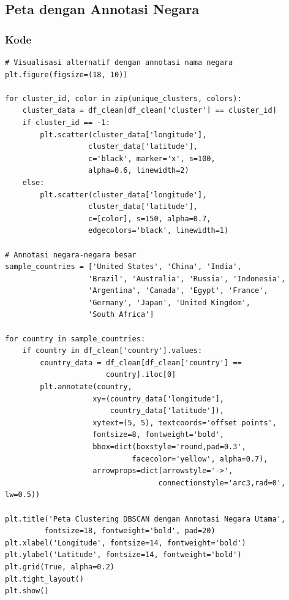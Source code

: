 \documentclass[12pt,a4paper]{article}
\begin{document}
\subsection{Peta dengan Annotasi Negara}

\subsubsection{Kode}
\begin{lstlisting}[style=pythonstyle]
# Visualisasi alternatif dengan annotasi nama negara
plt.figure(figsize=(18, 10))

for cluster_id, color in zip(unique_clusters, colors):
    cluster_data = df_clean[df_clean['cluster'] == cluster_id]
    if cluster_id == -1:
        plt.scatter(cluster_data['longitude'], 
                   cluster_data['latitude'],
                   c='black', marker='x', s=100, 
                   alpha=0.6, linewidth=2)
    else:
        plt.scatter(cluster_data['longitude'], 
                   cluster_data['latitude'],
                   c=[color], s=150, alpha=0.7, 
                   edgecolors='black', linewidth=1)

# Annotasi negara-negara besar
sample_countries = ['United States', 'China', 'India', 
                   'Brazil', 'Australia', 'Russia', 'Indonesia', 
                   'Argentina', 'Canada', 'Egypt', 'France', 
                   'Germany', 'Japan', 'United Kingdom', 
                   'South Africa']

for country in sample_countries:
    if country in df_clean['country'].values:
        country_data = df_clean[df_clean['country'] == 
                       country].iloc[0]
        plt.annotate(country, 
                    xy=(country_data['longitude'], 
                        country_data['latitude']),
                    xytext=(5, 5), textcoords='offset points',
                    fontsize=8, fontweight='bold',
                    bbox=dict(boxstyle='round,pad=0.3', 
                             facecolor='yellow', alpha=0.7),
                    arrowprops=dict(arrowstyle='->', 
                                   connectionstyle='arc3,rad=0', lw=0.5))

plt.title('Peta Clustering DBSCAN dengan Annotasi Negara Utama', 
         fontsize=18, fontweight='bold', pad=20)
plt.xlabel('Longitude', fontsize=14, fontweight='bold')
plt.ylabel('Latitude', fontsize=14, fontweight='bold')
plt.grid(True, alpha=0.2)
plt.tight_layout()
plt.show()
\end{lstlisting}
\end{document}
